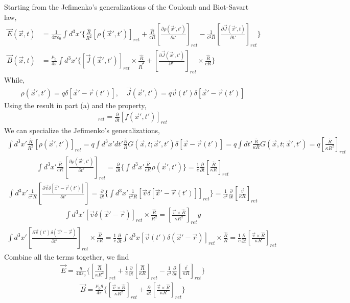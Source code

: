 \documentclass{article}
\newcommand{\pd}[2]{\frac{\partial#1}{\partial#2}}
\begin{document}
Starting from the Jefimenko's generalizations of the Coulomb and Biot-Savart law,
\begin{align*}
  \vec E(\vec x,t)&=\frac{1}{4\pi\varepsilon_0}\int d^3x'\{\frac{\hat R}{R^2}[\rho(\vec x',t')]_{ret}+\frac{\hat R}{cR}[\pd{\rho(\vec x',t')}{t'}]_{ret}-\frac{1}{c^2R}[\pd{\vec J(\vec x',t)}{t'}]_{ret} \}\\
  \vec B(\vec x,t)&=\frac{\mu_0}{4\pi}\int d^3x'\{[\vec J(\vec x',t')]_{ret}\times\frac{\hat R}{\vec R^2}+[\pd{\vec J(\vec x',t')}{t'}]_{ret}\times\frac{\hat R}{cR} \}
\end{align*}
While,
\begin{align*}
  \rho(\vec x',t')=q\delta[\vec x'-\vec r(t')],\quad \vec J(\vec x',t')=q\vec v(t')\delta[\vec x'-\vec r(t')]
\end{align*}
Using the result in part (a) and the property,
\begin{align*}
  [\pd{f(\vec x,t)}{t}]_{ret}=\pd{}{t}[f(\vec x',t')]_{ret}
\end{align*}
We can specialize the Jefimenko's generalizations,
\begin{align*}
  \int d^3x'\frac{\hat R}{R^2}[\rho(\vec x',t')]_{ret}=q\int d^3x'dt'\frac{\hat R}{R}G(\vec x,t;\vec x',t')\delta[\vec x-\vec r(t')]=q\int dt'\frac{\hat R}{\kappa R}G(\vec x,t;\vec x',t')=q[\frac{\hat R}{\kappa R^2}]_{ret}
\end{align*}
\begin{align*}
  \int d^3x'\frac{\hat R}{cR}[\pd{\rho(\vec x',t')}{t'}]_{ret}=\pd{}{t}\{\int d^3x'\frac{\hat R}{cR}\rho(\vec x',t')\}=\frac{1}{c}\pd{}{t}[\frac{\hat R}{\kappa R}]_{ret}
\end{align*}
\begin{align*}
  \int d^3x'{\frac{1}{c^2R}[\pd{\vec v\delta[\vec x'-\vec r(t')]}{t'}]}=\pd{}{t}\{\int d^3x'\frac{1}{c^2R}[\vec v\delta[\vec x'-\vec r(t')]]_{ret}\}=\frac{1}{c^2}\pd{}{t}[\frac{\vec v}{\kappa R}]_{ret}
\end{align*}
\begin{align*}
  \int d^3x'[\vec v\delta(\vec x'-\vec r)]_{ret}\times\frac{\hat R}{R^2}=[\frac{\vec v\times\hat R}{\kappa R^2}]_{ret}
y\end{align*}
\begin{align*}
  \int d^3x'[\pd{\vec v(t')\delta(\vec x'-\vec r)}{t'}]_{ret}\times\frac{\hat R}{cR}=\frac{1}{c}\pd{}{t}\int d^3x[\vec v(t')\delta(\vec x'-\vec r)]_{ret}\times\frac{\hat R}{R}=\frac{1}{c}\pd{}{t}[\frac{\vec v\times \hat R}{\kappa R}]_{ret}
\end{align*}
Combine all the terms together, we find
\begin{align*}
  \vec E=\frac{q}{4\pi\varepsilon_0}\{[\frac{\hat R}{\kappa R^2}]_{ret}+\frac{1}{c}\pd{}{t}[\frac{\hat R}{\kappa R}]_{ret}-\frac{1}{c^2}\pd{}{t}[\frac{\vec v}{\kappa R}]_{ret} \}
\end{align*}
\begin{align*}
  \vec B=\frac{\mu_0 q}{4\pi}\{[\frac{\vec v\times\hat R}{\kappa R^2}]_{ret}+\pd{}{t}[\frac{\vec v\times\hat R}{\kappa R}]_{ret}\}
\end{align*}
\end{document}
